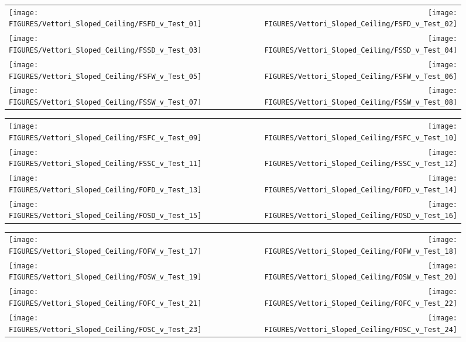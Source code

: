 \begin{figure}[p]
\begin{tabular*}{\textwidth}{l@{\extracolsep{\fill}}r}
\texttt{[image: FIGURES/Vettori\_Sloped\_Ceiling/FSFD\_v\_Test\_01]} &
\texttt{[image: FIGURES/Vettori\_Sloped\_Ceiling/FSFD\_v\_Test\_02]} \\
\texttt{[image: FIGURES/Vettori\_Sloped\_Ceiling/FSSD\_v\_Test\_03]} &
\texttt{[image: FIGURES/Vettori\_Sloped\_Ceiling/FSSD\_v\_Test\_04]} \\
\texttt{[image: FIGURES/Vettori\_Sloped\_Ceiling/FSFW\_v\_Test\_05]} &
\texttt{[image: FIGURES/Vettori\_Sloped\_Ceiling/FSFW\_v\_Test\_06]} \\
\texttt{[image: FIGURES/Vettori\_Sloped\_Ceiling/FSSW\_v\_Test\_07]} &
\texttt{[image: FIGURES/Vettori\_Sloped\_Ceiling/FSSW\_v\_Test\_08]} \\
\end{tabular*}
\label{Vettori_Sloped_1}
\end{figure}

\begin{figure}[p]
\begin{tabular*}{\textwidth}{l@{\extracolsep{\fill}}r}
\texttt{[image: FIGURES/Vettori\_Sloped\_Ceiling/FSFC\_v\_Test\_09]} &
\texttt{[image: FIGURES/Vettori\_Sloped\_Ceiling/FSFC\_v\_Test\_10]} \\
\texttt{[image: FIGURES/Vettori\_Sloped\_Ceiling/FSSC\_v\_Test\_11]} &
\texttt{[image: FIGURES/Vettori\_Sloped\_Ceiling/FSSC\_v\_Test\_12]} \\
\texttt{[image: FIGURES/Vettori\_Sloped\_Ceiling/FOFD\_v\_Test\_13]} &
\texttt{[image: FIGURES/Vettori\_Sloped\_Ceiling/FOFD\_v\_Test\_14]} \\
\texttt{[image: FIGURES/Vettori\_Sloped\_Ceiling/FOSD\_v\_Test\_15]} &
\texttt{[image: FIGURES/Vettori\_Sloped\_Ceiling/FOSD\_v\_Test\_16]} \\
\end{tabular*}
\label{Vettori_Sloped_2}
\end{figure}

\begin{figure}[p]
\begin{tabular*}{\textwidth}{l@{\extracolsep{\fill}}r}
\texttt{[image: FIGURES/Vettori\_Sloped\_Ceiling/FOFW\_v\_Test\_17]} &
\texttt{[image: FIGURES/Vettori\_Sloped\_Ceiling/FOFW\_v\_Test\_18]} \\
\texttt{[image: FIGURES/Vettori\_Sloped\_Ceiling/FOSW\_v\_Test\_19]} &
\texttt{[image: FIGURES/Vettori\_Sloped\_Ceiling/FOSW\_v\_Test\_20]} \\
\texttt{[image: FIGURES/Vettori\_Sloped\_Ceiling/FOFC\_v\_Test\_21]} &
\texttt{[image: FIGURES/Vettori\_Sloped\_Ceiling/FOFC\_v\_Test\_22]} \\
\texttt{[image: FIGURES/Vettori\_Sloped\_Ceiling/FOSC\_v\_Test\_23]} &
\texttt{[image: FIGURES/Vettori\_Sloped\_Ceiling/FOSC\_v\_Test\_24]} \\
\end{tabular*}
\label{Vettori_Sloped_3}
\end{figure}

